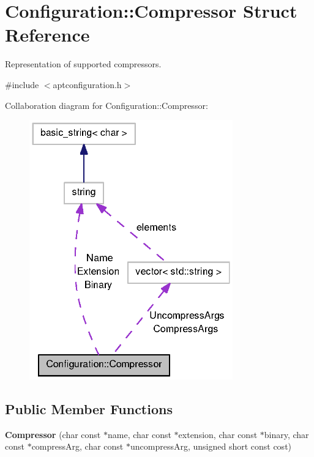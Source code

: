 \section{\-Configuration\-:\-:\-Compressor \-Struct \-Reference}
\label{structAPT_1_1Configuration_1_1Compressor}


\-Representation of supported compressors.  




{\ttfamily \#include $<$aptconfiguration.\-h$>$}



\-Collaboration diagram for \-Configuration\-:\-:\-Compressor\-:
\nopagebreak
\begin{figure}[H]
\begin{center}
\leavevmode
\includegraphics[width=249pt]{structAPT_1_1Configuration_1_1Compressor__coll__graph}
\end{center}
\end{figure}
\subsection*{\-Public \-Member \-Functions}
\begin{DoxyCompactItemize}
\item 
{\bfseries \-Compressor} (char const $\ast$name, char const $\ast$extension, char const $\ast$binary, char const $\ast$compress\-Arg, char const $\ast$uncompress\-Arg, unsigned short const cost)\label{structAPT_1_1Configuration_1_1Compressor_a1a813924d963bb4325b0f34cc6711ada}

\end{DoxyCompactItemize}
